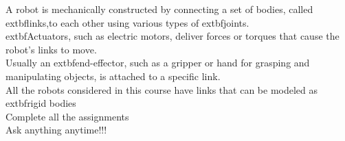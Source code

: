 \documentclass[preview]{standalone}
\begin{document}
A robot is mechanically constructed by connecting a set of bodies, called 	extbf{links},to each other using various types of 	extbf{joints}.\\	extbf{Actuators}, such as electric motors, deliver forces or torques that cause the robot’s links to move.\\Usually an 	extbf{end-effector}, such as a gripper or hand for grasping and manipulating objects, is attached to a specific link.\\All the robots considered in this course have links that can be modeled as 	extbf{rigid bodies}\\Complete all the assignments\\Ask anything anytime!!!\\
\end{document}
